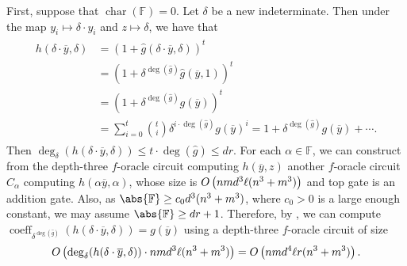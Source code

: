 \documentclass[10pt,a4paper]{amsart}
\DeclareMathOperator{\characteristic}{char}
\DeclareMathOperator{\coeff}{coeff}
\newcommand*\F{\mathbb{F}}
\newcommand*\bigO[1]{%
    O\kern-0.0pt\left(#1\right)
}
\begin{document}
\begin{pf}
    First, suppose that $\characteristic(\F) = 0$.
    Let $\delta$ be a new indeterminate.
    Then under the map $y_i \mapsto \delta \cdot y_i$ and $z \mapsto \delta$, we have that
    \begin{gather}
    \begin{aligned}\label{eq:det_computation_char_0}
        h(\delta \cdot \overline{y}, \delta) &=  (1 + \widehat{g}(\delta \cdot \overline{y}, \delta))^t \\
                                             &=  (1 + \delta^{\deg(\widehat{g})} \widehat{g}(\overline{y}, 1))^t \\
                                             &= (1 + \delta^{\deg(\widehat{g})} g(\overline{y}))^t \\
                                             &= \sum_{i = 0}^t \binom{t}{i} \delta^{i \cdot \deg(\widehat{g})} g(\overline{y})^i = 1 +  \delta^{\deg(\widehat{g})} g(\overline{y}) + \cdots.
    \end{aligned}
    \end{gather}
    Then $\deg_\delta(h(\delta \cdot \overline{y}, \delta)) \leq t \cdot \deg(\widehat{g}) \leq dr$.
    For each $\alpha\in\F$, we can construct from the depth-three $f$-oracle circuit computing $h(\overline{y},z)$ another $f$-oracle circuit $C_\alpha$ computing $h(\alpha \overline{y}, \alpha)$, whose size is $\bigO{nmd^3\ell(n^3+m^3)}$ and top gate is an addition gate.
    Also, as $\abs{\F} \geq c_0 d^3(n^3+m^3)$, where $c_0>0$ is a large enough constant, we may assume $\abs{\F} \geq dr+1$.
    Therefore, by , we can compute $\coeff_{\delta^{\deg(\widehat{g})}}(h(\delta\cdot \overline{y},\delta))=g(\overline{y})$ using a depth-three $f$-oracle circuit of size 
    \[
    \bigO{\deg_\delta(h(\delta \cdot \overline{y}, \delta))\cdot nmd^3\ell(n^3+m^3)}=\bigO{nmd^4\ell r(n^3+m^3)}.
    \]


\end{pf}
\end{document}
